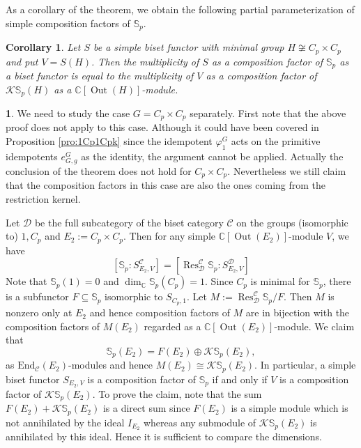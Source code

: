 \documentclass[12pt]{article}
\theoremstyle{plain}
\newtheorem{corollary}[theorem]{Corollary}
\theoremstyle{definition}
\newtheorem{nothing}[theorem]{}
\newcommand{\kerlin}{\mathbb S_p}
\newcommand{\res}{\operatorname{Res}}
\newcommand{\out}{\operatorname{Out}}
\begin{document}
\noindent As a corollary of the theorem, we obtain the following partial parameterization of simple composition factors of $\kerlin$.
\begin{corollary}\label{cor:resker1}
    Let $S$ be a simple biset functor with minimal group $H\not \cong C_p\times C_p$ and put $V = S(H)$. Then the multiplicity of $S$ as a composition factor of $\kerlin$ as a biset functor is equal to the multiplicity of $V$ as a composition factor of $\mathcal K\kerlin(H)$ as a $\mathbb C[\out(H)]$-module.
\end{corollary}

\begin{nothing} We need to study the case $G= C_p\times C_p$ separately. First note that the above proof does not apply to this case. Although it could have been covered in Proposition \ref{pro:1Cp1Cpk} since the idempotent $\varphi_1^G$ acts on the primitive idempotents $e_{G, g}^G$ as the identity, the argument cannot be applied. Actually the conclusion of the theorem does not hold for $C_p\times C_p$. Nevertheless we still claim that the composition factors in this case are also the ones coming from the restriction kernel.
\end{nothing}
Let $\mathcal D$ be the full subcategory of the biset category $\mathcal C$ on the groups (isomorphic to) $1, C_p$ and $E_2:= C_p\times C_p$. Then for any simple $\mathbb C[\out(E_2)]$-module $V$, we have
\[
[\kerlin : S_{E_2, V}^\mathcal{C}] = [\res^\mathcal{C}_\mathcal{D}\kerlin : S_{E_2, V}^\mathcal{D}]
\]
Note that $\kerlin(1) = 0$ and $\dim_\mathbb C\kerlin(C_p) = 1$. Since $C_p$ is minimal for $\kerlin$, there is a subfunctor $F\subseteq \kerlin$ isomorphic to $S_{C_p, 1}$. Let $M:= \res^\mathcal{C}_\mathcal{D}\kerlin/F$. Then $M$ is nonzero only at $E_2$ and hence composition factors of $M$ are in bijection with the composition factors of $M(E_2)$ regarded as a $\mathbb C[\out(E_2)]$-module. We claim that
\[
\kerlin(E_2) = F(E_2) \oplus \mathcal K\kerlin(E_2),
\]
as $\mathrm{End}_\mathcal C(E_2)$-modules and hence $M(E_2) \cong \mathcal K\kerlin(E_2)$. In particular, a simple biset functor $S_{E_2, V}$ is a composition factor of $\kerlin$ if and only if $V$ is a composition factor of $\mathcal K\kerlin(E_2)$. To prove the claim, note that the sum  $F(E_2) + \mathcal K\kerlin(E_2)$ is a direct sum since $F(E_2)$ is a simple module which is not annihilated by the ideal $I_{E_2}$ whereas any submodule of $\mathcal K\kerlin(E_2)$ is annihilated by this ideal. Hence it is sufficient to compare the dimensions. 
\end{document}
